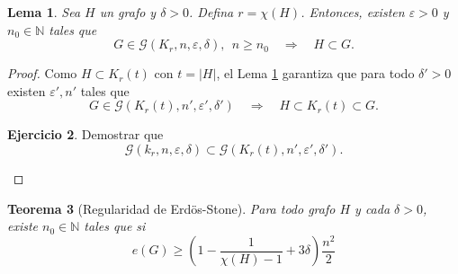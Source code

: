 \documentclass[12pt]{report}
\theoremstyle{plain}
\newtheorem{theorem}{Teorema}[section]
\newtheorem{lemma}[theorem]{Lema}
\theoremstyle{definition}
\newtheorem{exercise}[theorem]{Ejercicio}
\newcommand{\naturals}{\mathbb{N}}
\newcommand{\abs}[1]{\left \vert #1 \right \vert}
\begin{document}
\begin{lemma}\label{lema:regularidad de szemeredi - lema inmersion aplicable}
Sea $H$ un grafo y $\delta >0$. Defina $r = \chi (H)$. Entonces, existen $\varepsilon > 0$ y $n_0 \in \naturals$ tales que
\[
    G \in \mathcal G (K_r , n , \varepsilon, \delta), \:\:n \geq n_0 \quad \Rightarrow \quad H \subset G.
\]
\end{lemma}
\begin{proof}
Como $H \subset K_r (t)$ con $t = \abs H$, el Lema \ref{lema:regularidad de szemeredi - lema inmersion aplicable} garantiza que para todo $\delta ' > 0$ existen $\varepsilon ', n'$ tales que
\[
    G \in \mathcal G (K_r (t), n' , \varepsilon ' , \delta ') \quad \Rightarrow \quad H \subset K_r (t) \subset G.
\]
\begin{exercise}
Demostrar que
\[
    \mathcal G (k_r, n , \varepsilon, \delta) \subset \mathcal G (K_r (t), n', \varepsilon ', \delta ').
\]
\end{exercise}
\end{proof}

\begin{theorem}[Regularidad de Erdös-Stone]
Para todo grafo $H$ y cada $\delta > 0$, existe $n_0 \in \naturals$ tales que si
\[
    e(G) \geq \left ( 1 - \frac{1}{\chi (H)- 1} + 3 \delta\right ) \frac{n^2}{2}
\]
\end{theorem}
\end{document}
